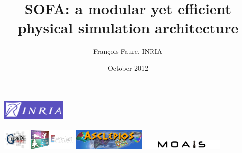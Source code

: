 \documentclass[a4paper,compress]{beamer}
\title{SOFA: a modular yet efficient physical simulation architecture}
\author{François Faure, INRIA}
\date{October 2012}
\begin{document}
\begin{frame}
  \maketitle
\begin{center}
\newcommand{\logoheight}{10mm}
 \includegraphics[height=\logoheight]{inria-logo.png} \\ \vspace{10mm}~ \\
 \includegraphics[height=\logoheight]{alcove-logo.jpg}
 \includegraphics[height=\logoheight]{evasion-logo.png}
 \includegraphics[height=\logoheight]{asclepios-logo.jpg}
 \includegraphics[height=5mm]{moais-logo.png}
\end{center}

\end{frame}
\end{document}
